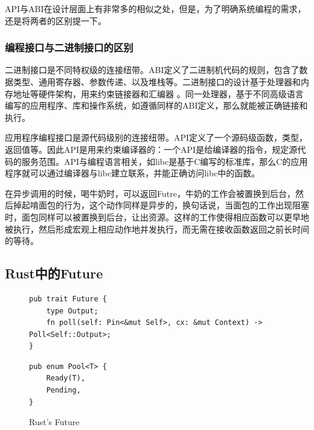 API与ABI在设计层面上有非常多的相似之处，但是，为了明确系统编程的需求，还是将两者的区别提一下。

\subsubsection*{编程接口与二进制接口的区别}

二进制接口是不同特权级的连接纽带。ABI定义了二进制机代码的规则，包含了数据类型、通用寄存器、参数传递、以及堆栈等。二进制接口的设计基于处理器和内存地址等硬件架构，用来约束链接器和汇编器 。同一处理器，基于不同高级语言编写的应用程序、库和操作系统，如遵循同样的ABI定义，那么就能被正确链接和执行。

应用程序编程接口是源代码级别的连接纽带。API定义了一个源码级函数，类型，返回值等。因此API是用来约束编译器的：一个API是给编译器的指令，规定源代码的服务范围。API与编程语言相关，如libc是基于C编写的标准库，那么C的应用程序就可以通过编译器与libc建立联系，并能正确访问libc中的函数。


在异步调用的时候，喝牛奶时，可以返回Futre，牛奶的工作会被置换到后台，然后掉起啃面包的行为，这个动作同样是异步的，换句话说，当面包的工作出现阻塞时，面包同样可以被置换到后台，让出资源。这样的工作使得相应函数可以更早地被执行，然后形成宏观上相应动作地并发执行，而无需在接收函数返回之前长时间的等待。

\subsection{Rust中的Future}

\begin{figure}[htbp]
    \figureCapSet
	\centering
	\begin{minipage}{0.49\linewidth}%
		\centering
\begin{lstlisting}[frame=none]
pub trait Future {
    type Output;
    fn poll(self: Pin<&mut Self>, cx: &mut Context) -> Poll<Self::Output>;
}
\end{lstlisting}
	\end{minipage}
    \hfill
	\begin{minipage}{0.49\linewidth}
		\centering
        \begin{lstlisting}[frame=none]
pub enum Pool<T> {
    Ready(T),
    Pending,
}
        \end{lstlisting}
	\end{minipage}
    \caption{Rust's Future}
\end{figure}

